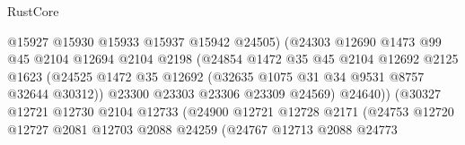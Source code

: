 \begin{lexlean}{RustCore}
\begin{coremodule}
                                        @15927
                                        @15930
                                        @15933
                                        @15937
                                        @15942
                                        @24505)
                                      (@24303
                                        @12690
                                        @1473
                                        @99
                                        @45
                                        @2104
                                        @12694
                                        @2104
                                        @2198
                                        (@24854
                                          @1472
                                          @35
                                          @45
                                          @2104
                                          @12692
                                          @2125
                                          @1623
                                          (@24525
                                            @1472
                                            @35
                                            @12692
                                            (@32635 @1075 @31 @34 @9531 @8757 @32644 @30312))
                                          @23300
                                          @23303
                                          @23306
                                          @23309
                                          @24569)
                                        @24640))
                                    (@30327
                                      @12721
                                      @12730
                                      @2104
                                      @12733
                                      (@24900
                                        @12721
                                        @12728
                                        @2171
                                        (@24753
                                          @12720
                                          @12727
                                          @2081
                                          @12703
                                          @2088
                                          @24259
                                          (@24767
                                            @12713
                                            @2088
                                            @24773

\end{coremodule}
\end{lexlean}
